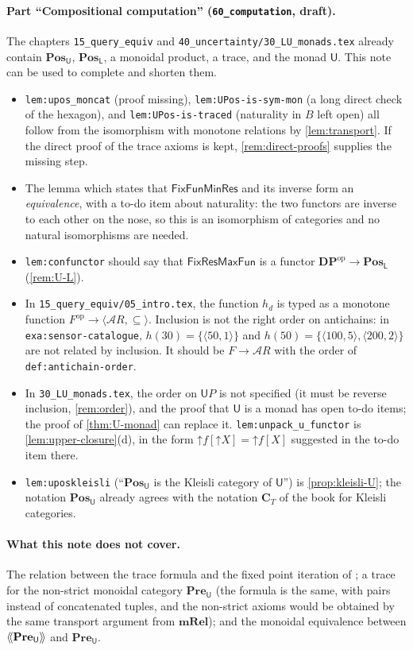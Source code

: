 \documentclass[11pt,a4paper]{article}
\theoremstyle{plain}
\theoremstyle{definition}
\theoremstyle{remark}
\newcommand{\Cat}[1]{\mathbf{#1}}
\newcommand{\Pre}{\Cat{Pre}}
\newcommand{\mRel}{\Cat{mRel}}
\newcommand{\DP}{\Cat{DP}}
\newcommand{\U}{\mathsf{U}}
\newcommand{\Lo}{\mathsf{L}}
\newcommand{\An}{\mathcal{A}}
\newcommand{\PreU}{\Pre_{\U}}
\providecommand{\llangle}{\mathopen{\langle\mkern-3.5mu\langle}}
\providecommand{\rrangle}{\mathclose{\rangle\mkern-3.5mu\rangle}}
\newcommand{\tL}[1]{\llangle #1 \rrangle}
\newcommand{\tup}[1]{\langle #1 \rangle}
\newcommand{\up}{\mathord{\uparrow}}
\newcommand{\op}{^{\mathrm{op}}}
\newcommand{\Fix}{\mathsf{FixFunMinRes}}
\newcommand{\FixR}{\mathsf{FixResMaxFun}}
\newcommand{\lbl}[1]{\nolinkurl{#1}}
\newcommand{\file}[1]{\nolinkurl{#1}}
\begin{document}
\paragraph{Part ``Compositional computation'' (\file{60_computation}, draft).}
The chapters \file{15_query_equiv} and \file{40_uncertainty/30_LU_monads.tex} already contain $\Cat{Pos}_{\U}$, $\Cat{Pos}_{\Lo}$, a monoidal product, a trace, and the monad $\U$.
This note can be used to complete and shorten them.
\begin{itemize}
    \item \lbl{lem:upos_moncat} (proof missing), \lbl{lem:UPos-is-sym-mon} (a long direct check of the hexagon), and \lbl{lem:UPos-is-traced} (naturality in $B$ left open) all follow from the isomorphism with monotone relations by \cref{lem:transport}. If the direct proof of the trace axioms is kept, \cref{rem:direct-proofs} supplies the missing step.
    \item The lemma which states that $\Fix$ and its inverse form an \emph{equivalence}, with a to-do item about naturality: the two functors are inverse to each other on the nose, so this is an isomorphism of categories and no natural isomorphisms are needed.
    \item \lbl{lem:confunctor} should say that $\FixR$ is a functor $\DP\op \to \Cat{Pos}_{\Lo}$ (\cref{rem:U-L}).
    \item In \file{15_query_equiv/05_intro.tex}, the function $h_d$ is typed as a monotone function $F\op \to \tup{\An R, \subseteq}$. Inclusion is not the right order on antichains: in \lbl{exa:sensor-catalogue}, $h(30) = \{\tup{50,1}\}$ and $h(50) = \{\tup{100,5}, \tup{200,2}\}$ are not related by inclusion. It should be $F \to \An R$ with the order of \lbl{def:antichain-order}.
    \item In \file{30_LU_monads.tex}, the order on $\U P$ is not specified (it must be reverse inclusion, \cref{rem:order}), and the proof that $\U$ is a monad has open to-do items; the proof of \cref{thm:U-monad} can replace it. \lbl{lem:unpack_u_functor} is \cref{lem:upper-closure}(d), in the form $\up f[\up X] = \up f[X]$ suggested in the to-do item there.
    \item \lbl{lem:uposkleisli} (``$\Cat{Pos}_{\U}$ is the Kleisli category of $\U$'') is \cref{prop:kleisli-U}; the notation $\Cat{Pos}_{\U}$ already agrees with the notation $\Cat{C}_T$ of the book for Kleisli categories.
\end{itemize}

\paragraph{What this note does not cover.}
The relation between the trace formula and the fixed point iteration of \cite{censi}; a trace for the non-strict monoidal category $\PreU$ (the formula is the same, with pairs instead of concatenated tuples, and the non-strict axioms would be obtained by the same transport argument from $\mRel$); and the monoidal equivalence between $\tL{\PreU}$ and $\PreU$.
\end{document}
